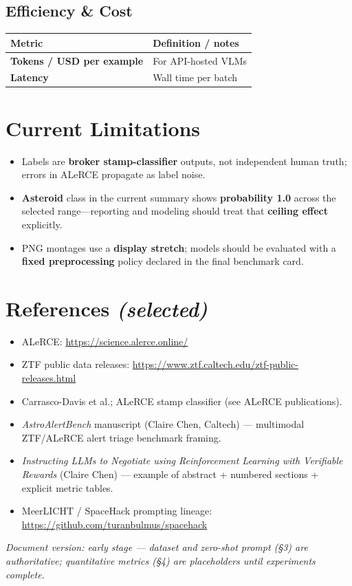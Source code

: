 \documentclass[11pt,a4paper]{article}
\begin{document}
\subsection{Efficiency \& Cost}

\begin{tabularx}{\textwidth}{@{}l X@{}}
\toprule
\textbf{Metric} & \textbf{Definition / notes} \\
\midrule
\textbf{Tokens / USD per example} & For API-hosted VLMs \\
\textbf{Latency} & Wall time per batch \\
\bottomrule
\end{tabularx}

\section{Current Limitations}

\begin{itemize}[leftmargin=*]
  \item Labels are \textbf{broker stamp-classifier} outputs, not independent human truth; errors in ALeRCE propagate as label noise.
  \item \textbf{Asteroid} class in the current summary shows \textbf{probability 1.0} across the selected range---reporting and modeling should treat that \textbf{ceiling effect} explicitly.
  \item PNG montages use a \textbf{display stretch}; models should be evaluated with a \textbf{fixed preprocessing} policy declared in the final benchmark card.
\end{itemize}

\section{References \textit{(selected)}}

\begin{itemize}[leftmargin=*,label={}]
  \item ALeRCE: \url{https://science.alerce.online/}
  \item ZTF public data releases: \url{https://www.ztf.caltech.edu/ztf-public-releases.html}
  \item Carrasco-Davis et al.; ALeRCE stamp classifier (see ALeRCE publications).
  \item \textit{AstroAlertBench} manuscript (Claire Chen, Caltech) --- multimodal ZTF/ALeRCE alert triage benchmark framing.
  \item \textit{Instructing LLMs to Negotiate using Reinforcement Learning with Verifiable Rewards} (Claire Chen) --- example of abstract + numbered sections + explicit metric tables.
  \item MeerLICHT / SpaceHack prompting lineage: \url{https://github.com/turanbulmus/spacehack}
\end{itemize}

\medskip
\noindent\textit{Document version: early stage --- dataset and zero-shot prompt (\S3) are authoritative; quantitative metrics (\S4) are placeholders until experiments complete.}
\end{document}
